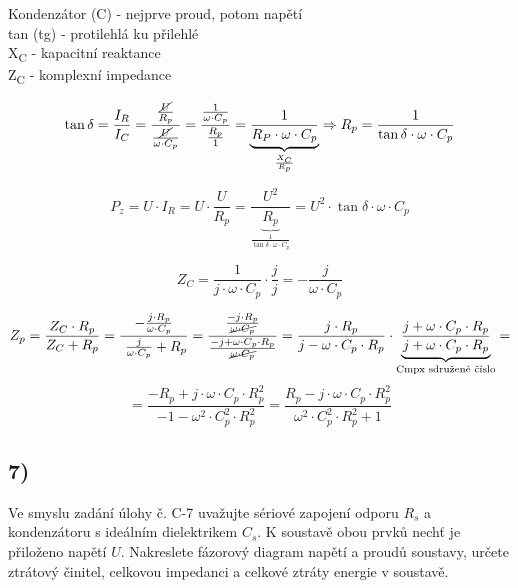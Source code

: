 Kondenzátor (C) - nejprve proud, potom napětí\\
tan (tg) - protilehlá ku přilehlé\\
X\textsubscript{C} - kapacitní reaktance\\
Z\textsubscript{C} - komplexní impedance

\begin{equation*}
    \tan \delta = \frac{I_R}{I_C} = \frac{\frac{\cancel{U}}{R_p}}{\frac{\cancel{U}}{\omega \cdot C_p}} = \frac{\frac{1}{\omega \cdot C_p}}{\frac{R_p}{1}} = \underbrace{\frac{1}{R_P \cdot \omega \cdot C_p}}_{\frac{X_C}{R_p}} \Rightarrow R_p = \frac{1}{\tan \delta \cdot \omega \cdot C_p}
\end{equation*}

\begin{equation*}
    P_z = U \cdot I_R = U \cdot \frac{U}{R_p} = \frac{U^2}{\underbrace{R_p}_{\frac{1}{\tan \delta \cdot \omega \cdot C_p}}} = U^2 \cdot \tan \delta \cdot \omega \cdot C_p
\end{equation*}

\begin{equation*}
    Z_C = \frac{1}{j \cdot \omega \cdot C_p} \cdot \frac{j}{j} = - \frac{j}{\omega \cdot C_p}
\end{equation*}

\begin{equation*}
    Z_p = \frac{Z_C \cdot R_p}{Z_C + R_p} = \frac{- \frac{j \cdot R_p}{\omega \cdot C_p}}{\ \frac{j}{\omega \cdot C_p} + R_p} = \frac{\frac{-j \cdot R_p}{\cancel{\omega \cdot C_p}}}{\frac{-j + \omega \cdot C_p \cdot R_p}{\cancel{\omega \cdot C_p}}} = \frac{j \cdot R_p}{j - \omega \cdot C_p \cdot R_p} \cdot \underbrace{\frac{j + \omega \cdot C_p \cdot R_p}{j + \omega \cdot C_p \cdot R_p}}_{\textrm{Cmpx sdružené číslo}} =
\end{equation*}
\begin{equation*}
    = \frac{-R_p + j \cdot \omega \cdot C_p \cdot R_p^2}{-1 - \omega^2 \cdot C_p^2 \cdot R_p^2} = \frac{R_p - j \cdot \omega \cdot C_p \cdot R_p^2}{\omega^2 \cdot C_p^2 \cdot R_p^2 + 1}
\end{equation*}


\subsection*{7)}
Ve smyslu zadání úlohy č. C-7 uvažujte sériové zapojení odporu $R_s$ a kondenzátoru s ideálním dielektrikem $C_s$. K soustavě obou prvků nechť je přiloženo napětí $U$. Nakreslete fázorový diagram napětí a proudů soustavy, určete ztrátový činitel, celkovou impedanci a celkové ztráty energie v soustavě.


